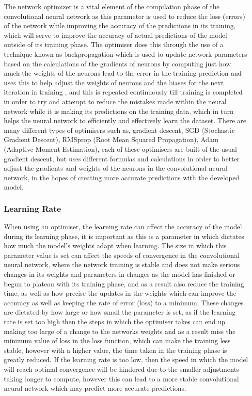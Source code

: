 \documentclass[]{final_report}
\begin{document}
The network optimizer is a vital element of the compilation phase of the convolutional neural network as this parameter is used to reduce the loss (errors) of the network while improving the accuracy of the predictions in its training, which will serve to improve the accuracy of actual predictions of the model outside of its training phase. The optimiser does this through the use of a technique known as backpropagation which is used to update network parameters based on the calculations of the gradients of neurons by computing just how much the weights of the neurons lead to the error in the training prediction and uses this to help adjust the weights of neurons and the biases for the next iteration in training , and this is repeated continuously till training is completed in order to try and attempt to reduce the mistakes made within the neural network while it is making its predictions on the training data, which in turn helps the neural network to efficiently and effectively learn the dataset. There are many different types of optimisers such as, gradient descent, SGD (Stochastic Gradient Descent), RMSprop (Root Mean Squared Propagation), Adam (Adaptive Moment Estimation), each of these optimisers are built of the usual gradient descent, but uses different formulas and calculations in order to better adjust the gradients and weights of the neurons in the convolutional neural network, in the hopes of creating more accurate predictions with the developed model.\cite{MachineMindscape2025}

\subsubsection{Learning Rate}

When using an optimiser, the learning rate can affect the accuracy of the model during its learning phase, it is important as this is a parameter in which dictates how much the model's weights adapt when learning. The size in which this parameter value is set can affect the speeds of convergence in the convolutional neural network, where the network training is stable and does not make serious changes in its weights and parameters in changes as the model has finished or begun to plateau with its training phase, and as a result also reduce the training time, as well as how precise the updates in the weights which can improve the accuracy as well as keeping the rate of error (loss) to a minimum. These changes are dictated by how large or how small the parameter is set, as if the learning rate is set too high then the steps in which the optimiser takes can end up making too large of a change to the networks weights and as a result miss the minimum value of loss in the loss function, which can make the training less stable, however with a higher value, the time taken in the training phase is greatly reduced. If the learning rate is too low, then the speed in which the model will reach optimal convergence will be hindered due to the smaller adjustments taking longer to compute, however this can lead to a more stable convolutional neural network which may predict more accurate predictions.\cite{LearningRate2025}
\end{document}
